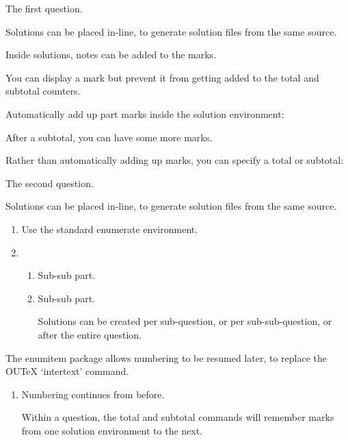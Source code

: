\documentclass{ouexam}
\begin{document}
\maketitle


The first question.

\begin{solution}
Solutions can be placed in-line, to generate solution files from the same source.

Inside solutions, notes can be added to the marks.

You can display a mark but prevent it from getting added to the total and subtotal counters.

Automatically add up part marks inside the solution environment:

\subtotal*

After a subtotal, you can have some more marks.

Rather than automatically adding up marks, you can specify a total or subtotal: 

\total*
\end{solution}

\question
The second question.

\begin{solution}
Solutions can be placed in-line, to generate solution files from the same source.
\end{solution}


\begin{enumerate}
\item Use the standard enumerate environment.
\item \begin{enumerate}
\item Sub-sub part.
\item Sub-sub part.
\begin{solution}
Solutions can be created per sub-question, or per sub-sub-question, or after the entire question.

\end{solution}
\end{enumerate}
\end{enumerate}
The enumitem package allows numbering to be resumed later, to replace the OUTeX `intertext' command.
\begin{enumerate}[resume]
\item Numbering continues from before.
\begin{solution}
Within a question, the total and subtotal commands will remember marks from one solution environment to the next.

\total*
\end{solution}
\end{enumerate}
\end{document}

